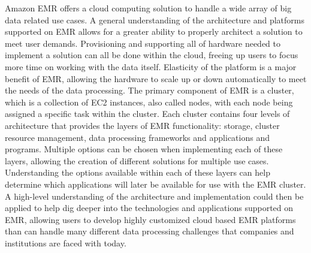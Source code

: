 Amazon EMR offers a cloud computing solution to handle a wide array of big data related use cases. A general understanding of the architecture and platforms supported on EMR allows for a greater ability to properly architect a solution to meet user demands. Provisioning and supporting all of hardware needed to implement a solution can all be done within the cloud, freeing up users to focus more time on working with the data itself. Elasticity of the platform is a major benefit of EMR, allowing the hardware to scale up or down automatically to meet the needs of the data processing. The primary component of EMR is a cluster, which is a collection of EC2 instances, also called nodes, with each node being assigned a specific task within the cluster. Each cluster contains four levels of architecture that provides the layers of EMR functionality: storage, cluster resource management, data processing frameworks and applications and programs. Multiple options can be chosen when implementing each of these layers, allowing the creation of different solutions for multiple use cases. Understanding the options available within each of these layers can help determine which applications will later be available for use with the EMR cluster. A high-level understanding of the architecture and implementation could then be applied to help dig deeper into the technologies and applications supported on EMR, allowing users to develop highly customized cloud based EMR platforms than can handle many different data processing challenges that companies and institutions are faced with today. 



 

